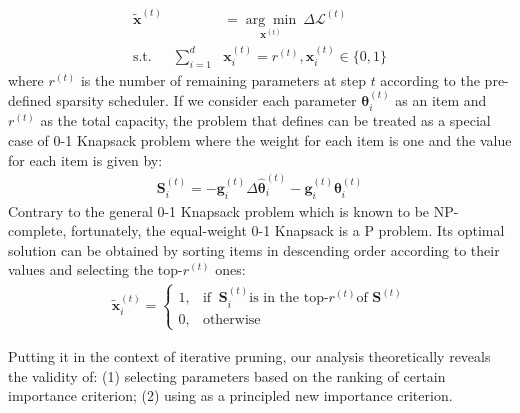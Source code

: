 \begin{align}
\nonumber
	\tilde{\bm{x}}^{(t)}&=\underset{\bm{x}^{(t)}}{\arg\min} ~\Delta\mathcal{L}^{(t)} \\
	\text{s.t.~~~~~}\sum_{i=1}^d &\bm{x}_i^{(t)}=r^{(t)}, \bm{x}_i^{(t)}\in\{0,1\} 
	\label{eq:10}
\end{align}
where $r^{(t)}$ is the number of remaining parameters at step $t$ according to the pre-defined sparsity scheduler. 
If we consider each parameter $\bm{\theta}^{(t)}_i$ as an item and $r^{(t)}$ as the total capacity,  the problem that  defines can be treated as a special case of 0-1 Knapsack problem where the weight for each item is one and the value for each item is given by:
\begin{align}
	\bm{S}_i^{(t)}=-\bm{g}_i^{(t)}\Delta\hat{\bm{\theta}}_i^{(t)}-\bm{g}_i^{(t)}\bm{\theta}_i^{(t)}
	\label{eq:score}
\end{align}
Contrary to the general 0-1 Knapsack problem which is known to be NP-complete, fortunately, the equal-weight 0-1 Knapsack is a P problem.  Its optimal solution can be obtained by sorting items in descending order according to their values and selecting the top-$r^{(t)}$ ones:
\begin{align}
	\tilde{\bm{x}}^{(t)}_i=
	\begin{cases} 
		1, & \text{if }~\bm{S}^{(t)}_i\text{is in the top-}r^{(t)}\text{of }\bm{S}^{(t)}\\
		0,  & \text{otherwise}  
	\end{cases}
	\label{eq:problem}
\end{align}

Putting it in the context of iterative pruning, our analysis theoretically reveals the validity of: (1) selecting parameters based on the ranking of certain importance criterion; (2) using  as a  principled new importance criterion.

